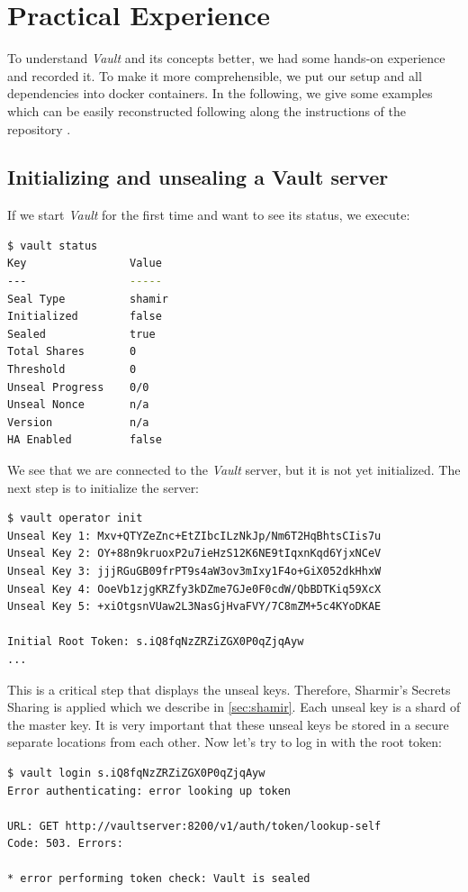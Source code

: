 \documentclass[runningheads]{llncs}
\begin{document}
\newpage

\section{Practical Experience}
To understand \textit{Vault} and its concepts better, we had some hands-on experience and recorded it. To make it more comprehensible, we put our setup and all dependencies into docker containers. In the following, we give some examples which can be easily reconstructed following along the instructions of the repository \cite{ref_url_repository}.

\subsection{Initializing and unsealing a Vault server}
If we start \textit{Vault} for the first time and want to see its status, we execute: 

\begin{lstlisting}[language=bash]
$ vault status
Key                Value
---                -----
Seal Type          shamir
Initialized        false
Sealed             true
Total Shares       0
Threshold          0
Unseal Progress    0/0
Unseal Nonce       n/a
Version            n/a
HA Enabled         false
\end{lstlisting}

We see that we are connected to the \textit{Vault} server, but it is not yet initialized. The next step is to initialize the server: 

\begin{lstlisting}[language=bash]
$ vault operator init
Unseal Key 1: Mxv+QTYZeZnc+EtZIbcILzNkJp/Nm6T2HqBhtsCIis7u
Unseal Key 2: OY+88n9kruoxP2u7ieHzS12K6NE9tIqxnKqd6YjxNCeV
Unseal Key 3: jjjRGuGB09frPT9s4aW3ov3mIxy1F4o+GiX052dkHhxW
Unseal Key 4: OoeVb1zjgKRZfy3kDZme7GJe0F0cdW/QbBDTKiq59XcX
Unseal Key 5: +xiOtgsnVUaw2L3NasGjHvaFVY/7C8mZM+5c4KYoDKAE

Initial Root Token: s.iQ8fqNzZRZiZGX0P0qZjqAyw
...
\end{lstlisting}

This is a critical step that displays the unseal keys. Therefore, Sharmir's Secrets Sharing is applied which we describe in \autoref{sec:shamir}. Each unseal key is a shard of the master key. It is very important that these unseal keys be stored in a secure separate locations from each other.  Now let's try to log in with the root token:

\begin{lstlisting}[language=bash]
$ vault login s.iQ8fqNzZRZiZGX0P0qZjqAyw
Error authenticating: error looking up token

URL: GET http://vaultserver:8200/v1/auth/token/lookup-self
Code: 503. Errors:

* error performing token check: Vault is sealed
\end{lstlisting}
\end{document}
